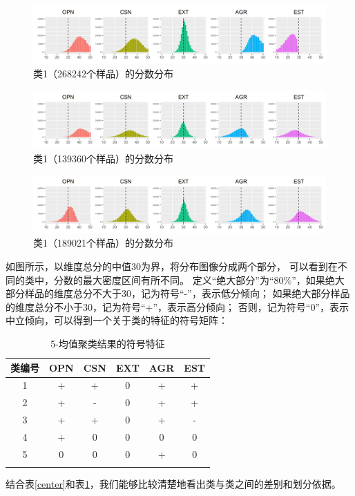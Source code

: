\documentclass[UTF8]{ctexart}
\begin{document}
\begin{figure}[H]
  \centering
  \includegraphics[scale=0.478]{Cluster3.png}
  \caption{类1（268242个样品）的分数分布}
\end{figure}
\begin{figure}[H]
  \centering
  \includegraphics[scale=0.478]{Cluster4.png}
  \caption{类1（139360个样品）的分数分布}
\end{figure}
\begin{figure}[H]
  \centering
  \includegraphics[scale=0.478]{Cluster5.png}
  \caption{类1（189021个样品）的分数分布}
\end{figure}
如图所示，以维度总分的中值30为界，将分布图像分成两个部分，
可以看到在不同的类中，分数的最大密度区间有所不同。
定义“绝大部分”为“80\%”，如果绝大部分样品的维度总分不大于30，记为符号“-”，表示低分倾向；
如果绝大部分样品的维度总分不小于30，记为符号“+”，表示高分倾向；
否则，记为符号“0”，表示中立倾向，可以得到一个关于类的特征的符号矩阵：
\begin{longtable}{c|c|c|c|c|c}
  \hline
  类编号 & OPN & CSN & EXT & AGR & EST \\\hline
  1   & +   & +   & 0   & +   & +   \\
  2   & +   & -   & 0   & +   & +   \\
  3   & +   & +   & 0   & +   & -   \\\hline
  4   & +   & 0   & 0   & 0   & 0   \\
  5   & 0   & 0   & 0   & +   & 0   \\\hline
  \caption{5-均值聚类结果的符号特征}
  \label{symbol}
\end{longtable}
结合表\ref{center}和表\ref{symbol}，我们能够比较清楚地看出类与类之间的差别和划分依据。
\end{document}
